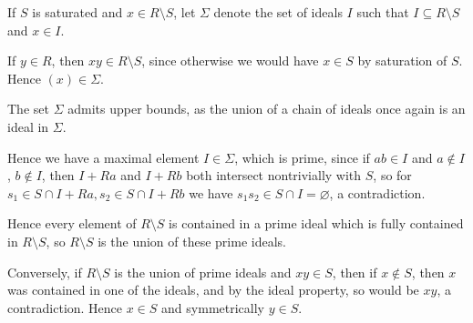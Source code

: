 If $S$ is saturated and $x \in R\setminus S$, let $\Sigma$ denote the set of
ideals $I$ such that $I \subseteq R\setminus S$ and $x \in I$.

If $y \in R$, then $xy \in R\setminus S$, since otherwise we would have
$x \in S$ by saturation of $S$. Hence $(x) \in \Sigma$.

The set $\Sigma$ admits upper bounds, as the union of a chain of ideals once again
is an ideal in $\Sigma$.

Hence we have a maximal element $I \in \Sigma$, which is prime, since if
$ab \in I$ and $a\notin I$, $b\notin I$, then $I + Ra$ and $I + Rb$ both
intersect nontrivially with $S$, so for $s_1 \in S\cap I + Ra, s_2 \in S\cap I+ Rb$
we have $s_1s_2 \in S\cap I = \varnothing$, a contradiction.

Hence every element of $R\setminus S$ is contained in a prime ideal which is
fully contained in $R\setminus S$,  so $R\setminus S$ is the union of
these prime ideals.

Conversely, if $R\setminus S$ is the union of prime ideals and $xy \in S$,
then if $x\notin S$, then $x$ was contained in one of the ideals, and by the
ideal property, so would be $xy$, a contradiction. Hence $x \in S$ and
symmetrically $y \in S$.
